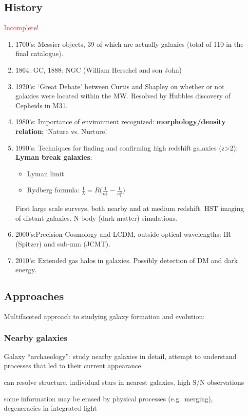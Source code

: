 \documentclass{article}
\begin{document}
\subsection{History}
\textcolor{red}{Incomplete!}
\begin{enumerate}
    \item 1700's: Messier objects, 39 of
        which are actually galaxies (total of 110 in the final catalogue).
    \item 1864: GC, 1888: NGC (William Herschel and son John)
    \item 1920's: `Great Debate' between Curtis and Shapley on whether
        or not galaxies were located within the MW\@. Resolved by Hubbles
        discovery of Cepheids in M31.
    \item 1980's: Importance of environment recognized:
        \textbf{morphology/density relation}; `Nature vs. Nurture'.
    \item 1990's: Techniques for finding and confirming high redshift
        galaxies (z>2): \textbf{Lyman break galaxies}:
        \begin{itemize}
            \item Lyman limit
            \item Rydberg formula: $\frac{1}{\lambda}=
                R\Big(\frac{1}{n_u^2}-\frac{1}{n_l^2}\Big) $
        \end{itemize}
        First large scale surveys, both nearby and at medium redshift. HST
        imaging of distant galaxies. N-body (dark matter) simulations.
    \item 2000's:Precision Cosmology and LCDM, outside optical
        wavelengths: IR (Spitzer) and sub-mm (JCMT).
    \item 2010's: Extended gas halos in galaxies. Possibly detection of
        DM and dark energy.
\end{enumerate}

\subsection{Approaches}
Multifaceted approach to studying galaxy formation and evolution:
\subsubsection{Nearby galaxies}
Galaxy ``archaeology'': study nearby galaxies in detail,
attempt to understand processes that led to their current
appearance.
\begin{description}[labelindent=2em, labelwidth=8em, leftmargin=12em]
    \item [Advantages] can resolve structure, individual stars
        in nearest galaxies, high S/N observations
    \item [Disadvantages] some information may be erased by physical processes
        (e.g.\ merging), degeneracies in integrated light
\end{description}
\end{document}

